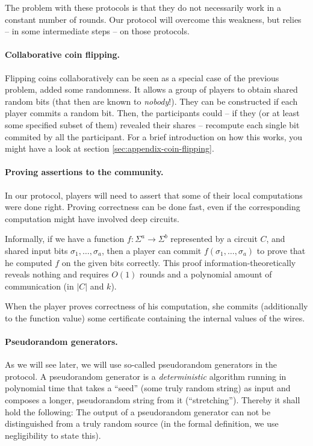 \message{ !name(seminar.tex)}\documentclass{llncs}
\newcommand{\todo}[1]{ {\color{red}{\textbf{#1}}}}
\begin{document}
The problem with these protocols is that they do not necessarily work in a constant number of rounds. Our protocol will overcome this weakness, but relies -- in some intermediate steps -- on those protocols.

\paragraph{Collaborative coin flipping.}

Flipping coins collaboratively can be seen as a special case of the previous problem, added some randomness. It allows a group of players to obtain shared random bits (that then are known to \emph{nobody}!). They can be constructed if each player commits a random bit. Then, the participants could -- if they (or at least some specified subset of them) revealed their shares -- recompute each single bit commited by all the participant. For a brief introduction on how this works, you might have a look at section \ref{sec:appendix-coin-flipping}.

\paragraph{Proving assertions to the community.}

In our protocol, players will need to assert that some of their local computations were done right. Proving correctness can be done fast, even if the corresponding computation might have involved deep circuits.

Informally, if we have a function $f:\Sigma^a \rightarrow\Sigma^b$ represented by a circuit $C$, and shared input bits $\sigma_1,\dots,\sigma_a$, then a player can commit $f(\sigma_1,\dots,\sigma_a)$ to prove that he computed $f$ on the given bits correctly. This proof information-theoretically reveals nothing and requires $O(1)$ rounds and a polynomial amount of communication (in $|C|$ and $k$).

When the player proves correctness of his computation, she commits (additionally to the function value) some certificate containing the internal values of the wires. 


\paragraph{Pseudorandom generators.}

As we will see later, we will use so-called pseudorandom generators in the protocol. A pseudorandom generator is a \emph{deterministic} algorithm running in polynomial time that takes a ``seed'' (some truly random string) as input and composes a longer, pseudorandom string from it (``stretching''). Thereby it shall hold the following: The output of a pseudorandom generator can not be distinguished from a truly random source (in the formal definition, we use negligibility to state this).
\end{document}
